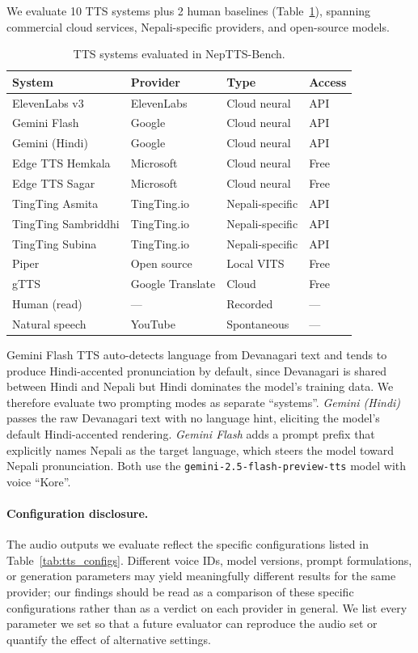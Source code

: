\documentclass[11pt]{article}
\begin{document}
We evaluate 10 TTS systems plus 2 human baselines (Table~\ref{tab:systems}), spanning commercial cloud services, Nepali-specific providers, and open-source models.

\begin{table}[h]
\centering
\caption{TTS systems evaluated in NepTTS-Bench.}
\label{tab:systems}
\begin{tabular}{llll}
\toprule
System & Provider & Type & Access \\
\midrule
ElevenLabs v3 & ElevenLabs & Cloud neural & API \\
Gemini Flash & Google & Cloud neural & API \\
Gemini (Hindi) & Google & Cloud neural & API \\
Edge TTS Hemkala & Microsoft & Cloud neural & Free \\
Edge TTS Sagar & Microsoft & Cloud neural & Free \\
TingTing Asmita & TingTing.io & Nepali-specific & API \\
TingTing Sambriddhi & TingTing.io & Nepali-specific & API \\
TingTing Subina & TingTing.io & Nepali-specific & API \\
Piper & Open source & Local VITS & Free \\
gTTS & Google Translate & Cloud & Free \\
\midrule
Human (read) & --- & Recorded & --- \\
Natural speech & YouTube & Spontaneous & --- \\
\bottomrule
\end{tabular}
\end{table}

Gemini Flash TTS auto-detects language from Devanagari text and tends to produce Hindi-accented pronunciation by default, since Devanagari is shared between Hindi and Nepali but Hindi dominates the model's training data. We therefore evaluate two prompting modes as separate ``systems''. \emph{Gemini (Hindi)} passes the raw Devanagari text with no language hint, eliciting the model's default Hindi-accented rendering. \emph{Gemini Flash} adds a prompt prefix that explicitly names Nepali as the target language, which steers the model toward Nepali pronunciation. Both use the \texttt{gemini-2.5-flash-preview-tts} model with voice ``Kore''.

\paragraph{Configuration disclosure.} The audio outputs we evaluate reflect the specific configurations listed in Table~\ref{tab:tts_configs}. Different voice IDs, model versions, prompt formulations, or generation parameters may yield meaningfully different results for the same provider; our findings should be read as a comparison of these specific configurations rather than as a verdict on each provider in general. We list every parameter we set so that a future evaluator can reproduce the audio set or quantify the effect of alternative settings.
\end{document}
